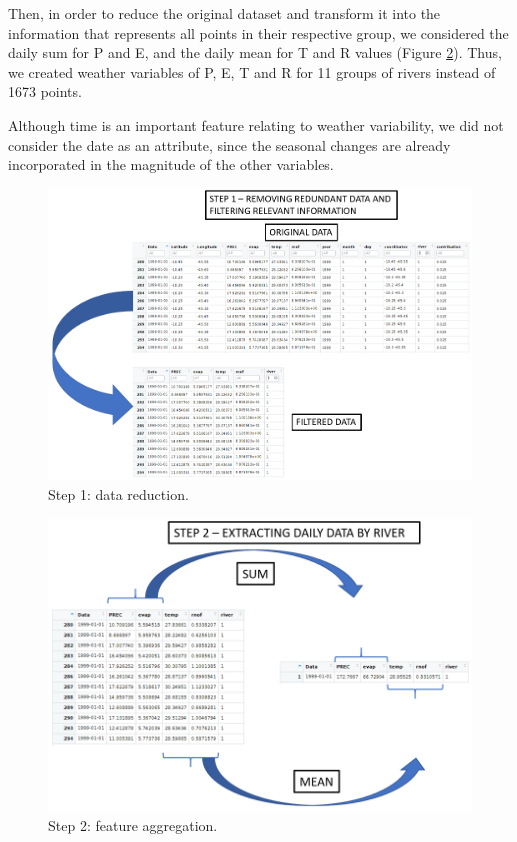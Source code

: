 \documentclass[12pt]{article}
\begin{document}
Then, in order to reduce the original dataset and transform it into the information that represents all points in their respective group, we considered the daily sum for P and E, and the daily mean for T and R values (Figure \ref{fig:step2}). Thus, we created weather variables of P, E, T and R for 11 groups of rivers instead of 1673 points.

Although time is an important feature relating to weather variability, we did not consider the date as an attribute, since the seasonal changes are already incorporated in the magnitude of the other variables.

\begin{figure}[htbp]
  \centering
  \includegraphics[width=1\linewidth, trim=0cm 0 0 2.2cm,clip=true]{Figures/STEP1.png}
  \caption{Step 1: data reduction.}
  \label{fig:step1}
\end{figure}

\begin{figure}[htbp]
  \centering
  \includegraphics[width=1\linewidth, trim=0cm 0 0 1.5cm,clip=true]{Figures/STEP2.png}
  \caption{Step 2: feature aggregation.}
  \label{fig:step2}
\end{figure}
\end{document}
